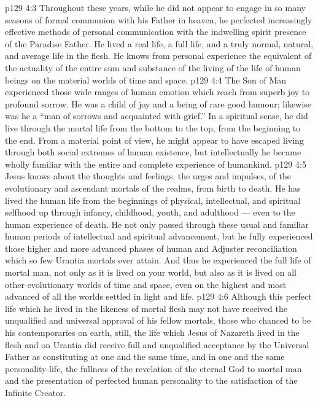 \vs p129 4:3 Throughout these years, while he did not appear to engage in so many seasons of formal communion with his Father in heaven, he perfected increasingly effective methods of personal communication with the indwelling spirit presence of the Paradise Father. He lived a real life, a full life, and a truly normal, natural, and average life in the flesh. He knows from personal experience the equivalent of the actuality of the entire sum and substance of the living of the life of human beings on the material worlds of time and space.
\vs p129 4:4 The Son of Man experienced those wide ranges of human emotion which reach from superb joy to profound sorrow. He was a child of joy and a being of rare good humour; likewise was he a “man of sorrows and acquainted with grief.” In a spiritual sense, he did live through the mortal life from the bottom to the top, from the beginning to the end. From a material point of view, he might appear to have escaped living through both social extremes of human existence, but intellectually he became wholly familiar with the entire and complete experience of humankind.
\vs p129 4:5 Jesus knows about the thoughts and feelings, the urges and impulses, of the evolutionary and ascendant mortals of the realms, from birth to death. He has lived the human life from the beginnings of physical, intellectual, and spiritual selfhood up through infancy, childhood, youth, and adulthood --- even to the human experience of death. He not only passed through these usual and familiar human periods of intellectual and spiritual advancement, but he  fully experienced those higher and more advanced phases of human and Adjuster reconciliation which so few Urantia mortals ever attain. And thus he experienced the full life of mortal man, not only as it is lived on your world, but also as it is lived on all other evolutionary worlds of time and space, even on the highest and most advanced of all the worlds settled in light and life.
\vs p129 4:6 Although this perfect life which he lived in the likeness of mortal flesh may not have received the unqualified and universal approval of his fellow mortals, those who chanced to be his contemporaries on earth, still, the life which Jesus of Nazareth lived in the flesh and on Urantia did receive full and unqualified acceptance by the Universal Father as constituting at one and the same time, and in one and the same personality\hyp{}life, the fullness of the revelation of the eternal God to mortal man and the presentation of perfected human personality to the satisfaction of the Infinite Creator.
